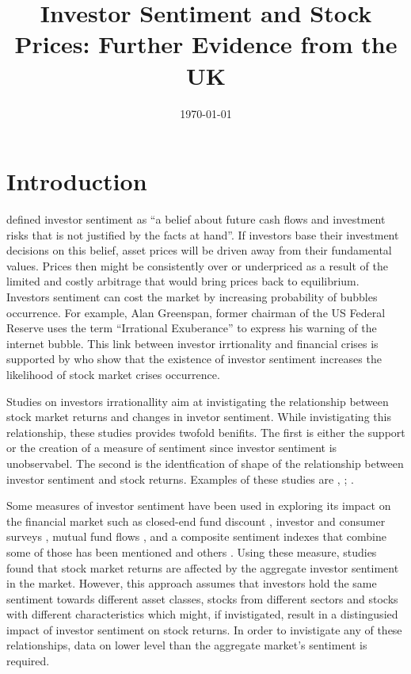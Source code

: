 \documentclass[12pt]{article}																																															%
\title{Investor Sentiment and Stock Prices: Further Evidence from the UK}																							%
\date{\today{}}																																																					%
\begin{document}
	\maketitle{}


\section{Introduction}

\cite{Baker2007a} defined investor sentiment as “a belief about future cash flows and investment risks that is not justified by the facts at hand”. If investors base their investment decisions on this belief, asset prices will be driven away from their fundamental values. Prices then might be consistently over or underpriced as a result of the limited and costly arbitrage that would bring prices back to equilibrium. Investors sentiment can cost the market by increasing probability of bubbles occurrence. For example, Alan Greenspan, former chairman of the US Federal Reserve uses the term “Irrational Exuberance” to express his warning of the internet bubble. This link between investor irrtionality and financial crises is supported by \cite{Zouaoui2011} who show that the existence of investor sentiment increases the likelihood of stock market crises occurrence. 

\par Studies on investors irrationallity aim at invistigating the relationship between stock market returns and changes in invetor sentiment. While invistigating this relationship, these studies provides twofold benifits. The first is either the support or the creation of a measure of sentiment since investor sentiment is unobservabel. The second is the identfication of shape of the relationship between investor sentiment and stock returns. Examples of these studies are \cite{Solt1988}, \cite{Lee1991,Abraham1993,Neal1998,Eichengreen1998,Fisher2000,Wang2003}; \cite{Baker2006, Chang2007,Beaumont2008}.

\par Some measures of investor sentiment have been used in exploring its impact on the financial market such as closed-end fund discount \cite{Lee1991}, investor and consumer surveys \cite{Otoo1999, Jansen2003, Schmeling2009}, mutual fund flows \cite{Brown2003}, and a composite sentiment indexes that combine some of those has been mentioned and others \cite{Brown2004, Baker2006}. Using these measure, studies found that stock market returns are affected by the aggregate investor sentiment in the market. However, this approach assumes that investors hold the same sentiment towards different asset classes, stocks from different sectors  and stocks with different characteristics which might, if invistigated, result in a distingusied impact of investor sentiment on stock returns. In order to invistigate any of these relationships, data on lower level than the aggregate market's sentiment is required.
\end{document}
